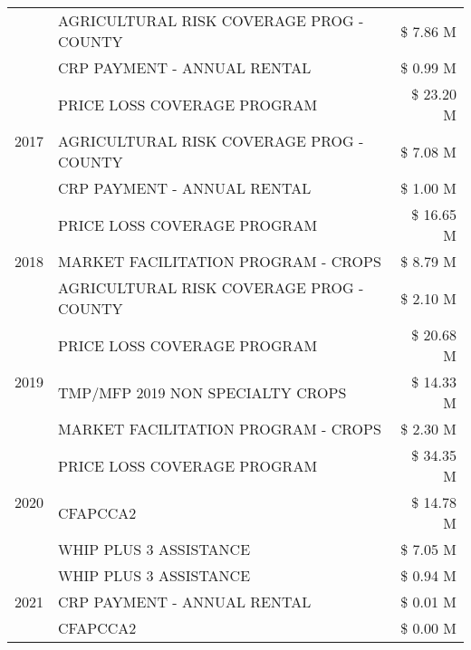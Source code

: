 \begin{tabular}{llr}
 & AGRICULTURAL RISK COVERAGE PROG - COUNTY & \$ 7.86 M \\
 & CRP PAYMENT - ANNUAL RENTAL & \$ 0.99 M \\
\cline{1-3}
\multirow[t]{3}{*}{2017} & PRICE LOSS COVERAGE PROGRAM & \$ 23.20 M \\
 & AGRICULTURAL RISK COVERAGE PROG - COUNTY & \$ 7.08 M \\
 & CRP PAYMENT - ANNUAL RENTAL & \$ 1.00 M \\
\cline{1-3}
\multirow[t]{3}{*}{2018} & PRICE LOSS COVERAGE PROGRAM & \$ 16.65 M \\
 & MARKET FACILITATION PROGRAM - CROPS & \$ 8.79 M \\
 & AGRICULTURAL RISK COVERAGE PROG - COUNTY & \$ 2.10 M \\
\cline{1-3}
\multirow[t]{3}{*}{2019} & PRICE LOSS COVERAGE PROGRAM & \$ 20.68 M \\
 & TMP/MFP 2019 NON SPECIALTY CROPS & \$ 14.33 M \\
 & MARKET FACILITATION PROGRAM - CROPS & \$ 2.30 M \\
\cline{1-3}
\multirow[t]{3}{*}{2020} & PRICE LOSS COVERAGE PROGRAM & \$ 34.35 M \\
 & CFAPCCA2 & \$ 14.78 M \\
 & WHIP PLUS 3 ASSISTANCE & \$ 7.05 M \\
\cline{1-3}
\multirow[t]{3}{*}{2021} & WHIP PLUS 3 ASSISTANCE & \$ 0.94 M \\
 & CRP PAYMENT - ANNUAL RENTAL & \$ 0.01 M \\
 & CFAPCCA2 & \$ 0.00 M \\
\cline{1-3}
\bottomrule
\end{tabular}
